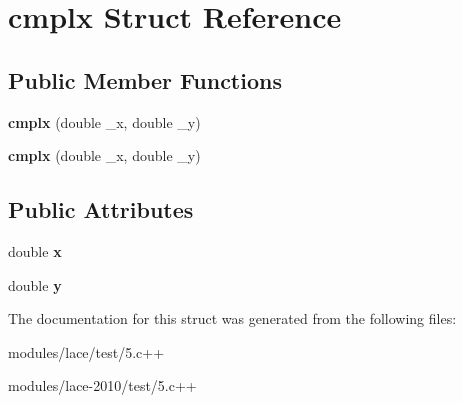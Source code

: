 \hypertarget{structcmplx}{\section{cmplx Struct Reference}
\label{structcmplx}
}
\subsection*{Public Member Functions}
\begin{DoxyCompactItemize}
\item 
\hypertarget{structcmplx_a489f61ef84061fc8a05ee91279430713}{{\bfseries cmplx} (double \-\_\-x, double \-\_\-y)}\label{structcmplx_a489f61ef84061fc8a05ee91279430713}

\item 
\hypertarget{structcmplx_a489f61ef84061fc8a05ee91279430713}{{\bfseries cmplx} (double \-\_\-x, double \-\_\-y)}\label{structcmplx_a489f61ef84061fc8a05ee91279430713}

\end{DoxyCompactItemize}
\subsection*{Public Attributes}
\begin{DoxyCompactItemize}
\item 
\hypertarget{structcmplx_ad507eefb02d2110105cf002f698784d8}{double {\bfseries x}}\label{structcmplx_ad507eefb02d2110105cf002f698784d8}

\item 
\hypertarget{structcmplx_ad823b070e64ad6b69ba2211ac2624f58}{double {\bfseries y}}\label{structcmplx_ad823b070e64ad6b69ba2211ac2624f58}

\end{DoxyCompactItemize}


The documentation for this struct was generated from the following files\-:\begin{DoxyCompactItemize}
\item 
modules/lace/test/5.\-c++\item 
modules/lace-\/2010/test/5.\-c++\end{DoxyCompactItemize}
